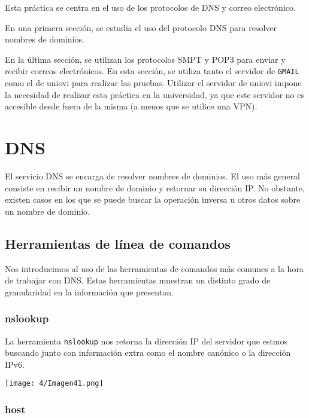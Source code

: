 \label{chap:4}

Esta práctica se centra en el uso de los protocolos de DNS y correo electrónico.

En una primera sección, se estudia el uso del protocolo DNS para resolver nombres de dominios.

En la última sección, se utilizan los protocolos SMPT y POP3 para enviar y recibir correos electrónicos.
En esta sección, se utiliza tanto el servidor de \verb#GMAIL# como el de uniovi para realizar las pruebas.
Utilizar el servidor de uniovi impone la necesidad de realizar esta práctica en la universidad,
ya que este servidor no es accesible desde fuera de la misma (a menos que se utilice una VPN).

\section{DNS}

El servicio DNS se encarga de resolver nombres de dominios.
El uso más general consiste en recibir un nombre de dominio y retornar su dirección IP.
No obstante, existen casos en los que se puede buscar la operación inversa u
otros datos sobre un nombre de dominio.

\subsection{Herramientas de línea de comandos}

Nos introducimos al uso de las herramientas de comandos más comunes a la hora de trabajar con DNS.
Estas herramientas muestran un distinto grado de granularidad en la información que presentan.

\subsubsection{nslookup}

La herramienta \verb#nslookup# nos retorna la dirección IP del servidor que estmos buscando
junto con información extra como el nombre canónico o la dirección IPv6.

\begin{minipage}{\linewidth}
	\centering
	\texttt{[image: 4/Imagen41.png]}
	\label{fig:4/1}
\end{minipage}

\subsubsection{host}

